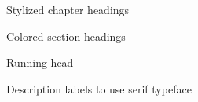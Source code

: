 \documentclass[Coomer-main.tex]{subfiles}
\begin{document}
\label{chap:changelog}

\begin{changelog}
\begin{version}[v=3.0.0, date=2020-11-20, author=PDFanon]
		\added
	\item Stylized chapter headings
	\item Colored section headings
	\item Running head
		\changed
	\item Description labels to use serif typeface
	\end{version}
\end{changelog}
\end{document}
